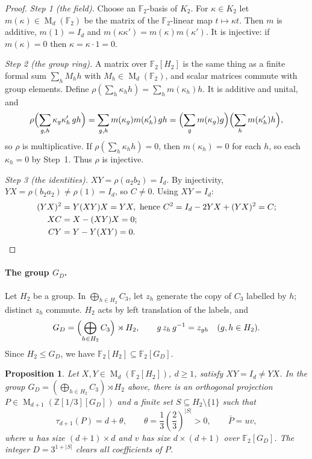 \documentclass[11pt]{article}
\newtheorem{proposition}[theorem]{Proposition}
\theoremstyle{remark}
\numberwithin{equation}{section}
\newcommand{\F}{\mathbb F}
\newcommand{\Z}{\mathbb Z}
\newcommand{\Mat}{\operatorname{M}}
\begin{document}
\begin{proof}
\emph{Step 1 (the field).} Choose an $\F_2$-basis of $K_2$. For $\kappa\in K_2$ let $m(\kappa)\in\Mat_d(\F_2)$ be the matrix of the $\F_2$-linear map $t\mapsto\kappa t$. Then $m$ is additive, $m(1)=I_d$ and $m(\kappa\kappa')=m(\kappa)m(\kappa')$. It is injective: if $m(\kappa)=0$ then $\kappa=\kappa\cdot1=0$.

\emph{Step 2 (the group ring).} A matrix over $\F_2[H_2]$ is the same thing as a finite formal sum $\sum_hM_hh$ with $M_h\in\Mat_d(\F_2)$, and scalar matrices commute with group elements. Define $\rho(\sum_h\kappa_hh)=\sum_hm(\kappa_h)h$. It is additive and unital, and
\[
 \rho\Bigl(\sum_{g,h}\kappa_g\kappa'_h\,gh\Bigr)
 =\sum_{g,h}m(\kappa_g)m(\kappa'_h)\,gh
 =\Bigl(\sum_gm(\kappa_g)g\Bigr)\Bigl(\sum_hm(\kappa'_h)h\Bigr),
\]
so $\rho$ is multiplicative. If $\rho(\sum_h\kappa_hh)=0$, then $m(\kappa_h)=0$ for each $h$, so each $\kappa_h=0$ by Step~1. Thus $\rho$ is injective.

\emph{Step 3 (the identities).} $XY=\rho(a_2b_2)=I_d$. By injectivity, $YX=\rho(b_2a_2)\ne\rho(1)=I_d$, so $C\ne0$. Using $XY=I_d$:
\begin{align*}
 (YX)^2&=Y(XY)X=YX,\ \text{hence } C^2=I_d-2YX+(YX)^2=C;\\
 XC&=X-(XY)X=0;\\
 CY&=Y-Y(XY)=0.\qedhere
\end{align*}
\end{proof}

\paragraph{The group $G_D$.}
Let $H_2$ be a group. In $\bigoplus_{h\in H_2}C_3$, let $z_h$ generate the copy of $C_3$ labelled by $h$; distinct $z_h$ commute. $H_2$ acts by left translation of the labels, and
\[
 G_D=\Bigl(\bigoplus_{h\in H_2}C_3\Bigr)\rtimes H_2,
 \qquad g\,z_h\,g^{-1}=z_{gh}\quad(g,h\in H_2).
\]
Since $H_2\le G_D$, we have $\F_2[H_2]\subseteq\F_2[G_D]$.

\begin{proposition}\label{prop:separation}
Let $X,Y\in\Mat_d(\F_2[H_2])$, $d\ge1$, satisfy
$XY=I_d\ne YX$. In the group
$G_D=(\bigoplus_{h\in H_2}C_3)\rtimes H_2$ above, there is an orthogonal
projection $P\in\Mat_{d+1}(\Z[1/3][G_D])$ and a finite set
$S\subseteq H_2\setminus\{1\}$ such that
\[
 \tau_{d+1}(P)=d+\theta,\qquad
 \theta=\frac13\left(\frac23\right)^{|S|}>0,
 \qquad \bar P=uv,
\]
where $u$ has size $(d+1)\times d$ and $v$ has size $d\times(d+1)$
over $\F_2[G_D]$. The integer $D=3^{1+|S|}$ clears all coefficients
of $P$.
\end{proposition}
\end{document}
